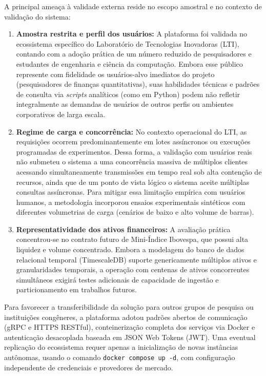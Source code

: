 A principal ameaça à validade externa reside no escopo amostral e no contexto de validação do sistema:
\begin{enumerate}
    \item \textbf{Amostra restrita e perfil dos usuários:} A plataforma foi validada no ecossistema específico do Laboratório de Tecnologias Inovadoras (LTI), contando com a adoção prática de um número reduzido de pesquisadores e estudantes de engenharia e ciência da computação. Embora esse público represente com fidelidade os usuários-alvo imediatos do projeto (pesquisadores de finanças quantitativas), suas habilidades técnicas e padrões de consulta via \textit{scripts} analíticos (como em Python) podem não refletir integralmente as demandas de usuários de outros perfis ou ambientes corporativos de larga escala.
    
    \item \textbf{Regime de carga e concorrência:} No contexto operacional do LTI, as requisições ocorrem predominantemente em lotes assíncronos ou execuções programadas de experimentos. Dessa forma, a validação com usuários reais não submeteu o sistema a uma concorrência massiva de múltiplos clientes acessando simultaneamente transmissões em tempo real sob alta contenção de recursos, ainda que de um ponto de vista lógico o sistema aceite múltiplas consultas assíncronas. Para mitigar essa limitação empírica com usuários humanos, a metodologia incorporou ensaios experimentais sintéticos com diferentes volumetrias de carga (cenários de baixo e alto volume de barras).
    
    \item \textbf{Representatividade dos ativos financeiros:} A avaliação prática concentrou-se no contrato futuro de Mini-Índice Ibovespa, que possui alta liquidez e volume concentrado. Embora a modelagem do banco de dados relacional temporal (TimescaleDB) suporte genericamente múltiplos ativos e granularidades temporais, a operação com centenas de ativos concorrentes simultâneos exigirá testes adicionais de capacidade de ingestão e particionamento em trabalhos futuros.
\end{enumerate}

Para favorecer a transferibilidade da solução para outros grupos de pesquisa ou instituições congêneres, a plataforma adotou padrões abertos de comunicação (gRPC e HTTPS RESTful), conteinerização completa dos serviços via Docker e autenticação desacoplada baseada em JSON Web Tokens (JWT). Uma eventual replicação do ecossistema requer apenas a inicialização de novas instâncias autônomas, usando o comando \texttt{docker compose up -d}, com configuração independente de credenciais e provedores de mercado.

